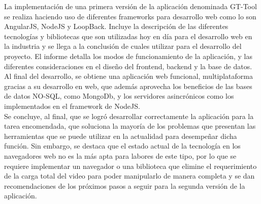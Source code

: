 La implementación de una primera versión de la aplicación denominada GT-Tool se realiza haciendo uso de diferentes frameworks para desarrollo web como lo son AngularJS, NodeJS y LoopBack. Incluye la descripción de las diferentes tecnologías y bibliotecas que son utilizadas hoy en día para el desarrollo web en la industria y se llega a la conclusión de cuales utilizar para el desarrollo del proyecto. El informe detalla los modos de funcionamiento de la aplicación, y las diferentes consideraciones en el diseño del frontend, backend y la base de datos. Al final del desarrollo, se obtiene una aplicación web funcional, multiplataforma gracias a su desarrollo en web, que además aprovecha los beneficios de las bases de datos NO-SQL, como MongoDb, y los servidores asincrónicos como los implementados en el framework de NodeJS.\\

Se concluye, al final, que se logró desarrollar correctamente la aplicación para la tarea encomendada, que soluciona la mayoría de los problemas que presentan las herramientas que se puede utilizar en la actualidad para desempeñar dicha función. Sin embargo, se destaca que el estado actual de la tecnología en los navegadores web no es la más apta para labores de este tipo, por lo que se requiere implementar un navegador o una biblioteca que elimine el requerimiento de la carga total del video para poder manipularlo de manera completa y se dan recomendaciones de los próximos pasos a seguir para la segunda versión de la aplicación.